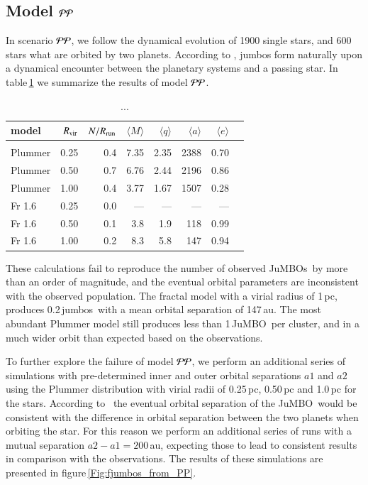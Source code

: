 \documentclass[aa]{aa}
\newcommand{\jumbo}{\mbox{JuMBO}}
\newcommand{\jumbos}{\mbox{JuMBOs}}
\begin{document}
\subsection{Model ${\cal PP}$}

In scenario ${\cal PP}$, we follow the dynamical evolution of 1900
single stars, and 600 stars what are orbited by two planets.  According
to \cite{2023arXiv231006016W}, jumbos form naturally upon a dynamical
encounter between the planetary systems and a passing star.  In
table\,\ref{Tab:model_PP} we summarize the results of model ${\cal
  PP}$.

\begin{table}
 \caption{...}
 \label{Tab:model_PP}
 \centering 
 \begin{tabular}{lrrrrrrr}
 \hline\hline
model &$R_{\rm vir}$ & $N/R_{\rm run}$ & $\langle M \rangle$ & $\langle q \rangle$ & $\langle a \rangle$ & $\langle e \rangle$ \\
        \hline \vspace{-0.75em}\\
 Plummer & 0.25 & 0.4 &  7.35	&2.35&	2388 &0.70	\\
 Plummer & 0.50 & 0.7 & 6.76    & 2.44 & 2196 & 0.86 \\
 Plummer & 1.00 & 0.4 & 3.77    & 1.67 & 1507 & 0.28\\
 Fr 1.6  & 0.25 & 0.0 &   ---   & ---  &  --- & --- \\			
 Fr 1.6  & 0.50 & 0.1 & 3.8     & 1.9 & 118 & 0.99\\
 Fr 1.6  & 1.00 &0.2  & 8.3     & 5.8 & 147 & 0.94 \\ 
 \hline
 \end{tabular}
\end{table}

These calculations fail to reproduce the number of observed \jumbos\,
by more than an order of magnitude, and the eventual orbital parameters
are inconsistent with the observed population.  The fractal model with
a virial radius of 1\,pc, produces 0.2\,jumbos\ with a mean orbital
separation of 147\,au. The most abundant Plummer model still produces
less than 1\,\jumbo\, per cluster, and in a much wider orbit than
expected based on the observations.

To further explore the failure of model ${\cal PP}$, we perform an
additional series of simulations with pre-determined inner and outer
orbital separations $a1$ and $a2$ using the Plummer distribution with
virial radii of 0.25\,pc, 0.50\,pc and 1.0\,pc for the stars.
According to \cite{2023arXiv231006016W}\, the eventual orbital
separation of the \jumbo\, would be consistent with the difference in
orbital separation between the two planets when orbiting the star. For
this reason we perform an additional series of runs with a mutual
separation $a2-a1 = 200$\,au, expecting those to lead to consistent
results in comparison with the observations.  The results of these
simulations are presented in figure\,\ref{Fig:fjumbos_from_PP}.
\end{document}
